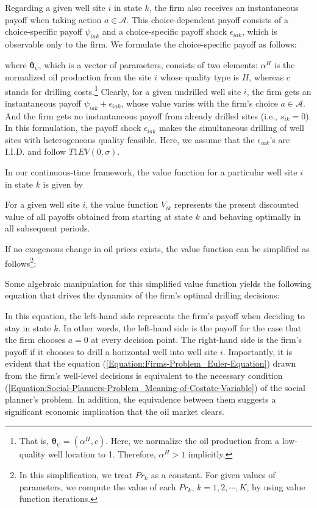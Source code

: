 Regarding a given well site $i$ in state $k$, the firm also receives an instantaneous payoff when taking action $a \in \mathcal{A}$. This choice-dependent payoff consists of a choice-specific payoff $\psi_{iak}$ and a choice-specific payoff shock $\epsilon_{iak}$, which is observable only to the firm. We formulate the choice-specific payoff as follows:

where $\boldsymbol{\theta}_{\psi}$, which is a vector of parameters, consists of two elements: $\alpha^{H}$ is the normalized oil production from the site $i$ whose quality type is $H$, whereas $c$ stands for drilling costs.\footnote{That is, $\boldsymbol{\theta}_{\psi} = (\alpha^{H}, c)$. Here, we normalize the oil production from a low-quality well location to 1. Therefore, $\alpha^{H} > 1$ implicitly.} Clearly, for a given undrilled well site $i$, the firm gets an instantaneous payoff $\psi_{iak} + \epsilon_{iak}$, whose value varies with the firm's choice $a \in \mathcal{A}$. And the firm gets no instantaneous payoff from already drilled sites (i.e., $s_{ik} = 0$). In this formulation, the payoff shock $\epsilon_{iak}$ makes the simultaneous drilling of well sites with heterogeneous quality feasible. Here, we assume that the $\epsilon_{iak}$'s are I.I.D. and follow $T1EV(0, \sigma)$. 

In our continuous-time framework, the value function for a particular well site $i$ in state $k$ is given by

For a given well site $i$, the value function $V_{ik}$ represents the present discounted value of all payoffs obtained from starting at state $k$ and behaving optimally in all subsequent periods. 

If no exogenous change in oil prices exists, the value function can be simplified as follows\footnote{In this simplification, we treat $Pr_{k}$ as a constant. For given values of parameters, we compute the value of each $Pr_{k}$, $k = 1, 2, \cdots, K$, by using value function iterations.}:

Some algebraic manipulation for this simplified value function yields the following equation that drives the dynamics of the firm's optimal drilling decisions:

In this equation, the left-hand side represents the firm's payoff when deciding to stay in state $k$. In other words, the left-hand side is the payoff for the case that the firm chooses $a = 0$ at every decision point. The right-hand side is the firm's payoff if it chooses to drill a horizontal well into well site $i$. Importantly, it is evident that the equation (\ref{Equation:Firms-Problem_Euler-Equation}) drawn from the firm's well-level decisions is equivalent to the necessary condition (\ref{Equation:Social-Planners-Problem_Meaning-of-Costate-Variable}) of the social planner's problem. In addition, the equivalence between them suggests a significant economic implication that the oil market clears. 
